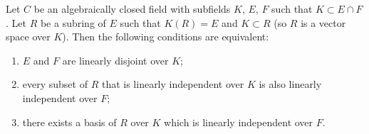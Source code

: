 Let $C$ be an algebraically closed field with subfields $K$, $E$, $F$ such that $K \subset E \cap F$.
Let $R$ be a subring of $E$ such that $K(R) = E$ and $K \subset R$ (so $R$ is a vector space over $K$).
Then the following conditions are equivalent:
\begin{enumerate}
\item[(i)] $E$ and $F$ are linearly disjoint over $K$;
\item[(ii)] every subset of $R$ that is linearly independent over $K$ is also linearly independent over $F$;
\item[(iii)] there exists a basis of $R$ over $K$ which is linearly independent over $F$.
\end{enumerate}
